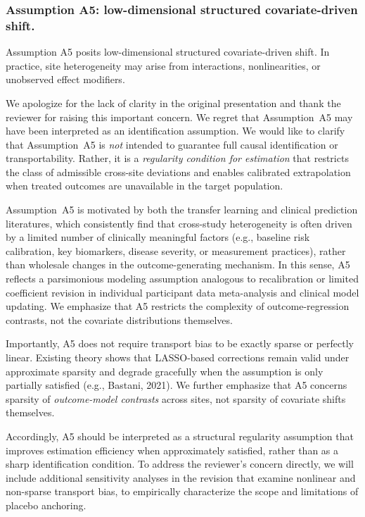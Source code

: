 \subsubsection{Assumption A5: low-dimensional structured covariate-driven shift.}  
Assumption A5 posits low-dimensional structured covariate-driven shift. In practice, site heterogeneity may arise from interactions, nonlinearities, or unobserved effect modifiers.


{\color{blue}
We apologize for the lack of clarity in the original presentation and thank the reviewer for raising this important concern. 
We regret that Assumption~A5 may have been interpreted as an identification assumption. We would like to clarify that Assumption~A5 is \emph{not} intended to guarantee full causal identification or transportability. 
Rather, it is a \emph{regularity condition for estimation} that restricts the class of admissible cross-site deviations and enables calibrated extrapolation when treated outcomes are unavailable in the target population. 

Assumption~A5 is motivated by both the transfer learning and clinical prediction literatures, which consistently find that cross-study heterogeneity is often driven by a limited number of clinically meaningful factors (e.g., baseline risk calibration, key biomarkers, disease severity, or measurement practices), rather than wholesale changes in the outcome-generating mechanism. 
In this sense, A5 reflects a parsimonious modeling assumption analogous to recalibration or limited coefficient revision in individual participant data meta-analysis and clinical model updating.
We emphasize that A5 restricts the complexity of outcome-regression contrasts,
not the covariate distributions themselves.

Importantly, A5 does not require transport bias to be exactly sparse or perfectly linear. Existing theory shows that LASSO-based corrections remain valid under approximate sparsity and degrade gracefully when the assumption is only partially satisfied (e.g., Bastani, 2021). We further emphasize that A5 concerns sparsity of \emph{outcome-model contrasts} across sites, not sparsity of covariate shifts themselves.

Accordingly, A5 should be interpreted as a structural regularity assumption that improves estimation efficiency when approximately satisfied, rather than as a sharp identification condition. To address the reviewer’s concern directly, we will include additional sensitivity analyses in the revision that examine nonlinear and non-sparse transport bias, to empirically characterize the scope and limitations of placebo anchoring.
}



